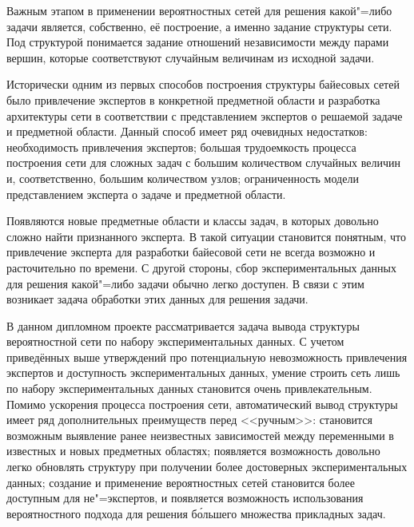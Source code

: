 Важным этапом в применении вероятностных сетей для решения какой"=либо задачи является, собственно, её построение, а именно задание структуры сети.
Под структурой понимается задание отношений независимости между парами вершин, которые соответствуют случайным величинам из исходной задачи.

Исторически одним из первых способов построения структуры байесовых сетей было привлечение экспертов в конкретной предметной области и разработка архитектуры сети в соответствии с представлением экспертов о решаемой задаче и предметной области.
Данный способ имеет ряд очевидных недостатков: необходимость привлечения экспертов; большая трудоемкость процесса построения сети для сложных задач с большим количеством случайных величин и, соответственно, большим количеством узлов; ограниченность модели представлением эксперта о задаче и предметной области.

Появляются новые предметные области и классы задач, в которых довольно сложно найти признанного эксперта.
В такой ситуации становится понятным, что привлечение эксперта для разработки байесовой сети не всегда возможно и расточительно по времени.
С другой стороны, сбор экспериментальных данных для решения какой"=либо задачи обычно легко доступен.
В связи с этим возникает задача обработки этих данных для решения задачи.

В данном дипломном проекте рассматривается задача вывода структуры вероятностной сети по набору экспериментальных данных.
С учетом приведённых выше утверждений про потенциальную невозможность привлечения экспертов и доступность экспериментальных данных, умение строить сеть лишь по набору экспериментальных данных становится очень привлекательным.
Помимо ускорения процесса построения сети, автоматический вывод структуры имеет ряд дополнительных преимуществ перед <<ручным>>: становится возможным выявление ранее неизвестных зависимостей между переменными в известных и новых предметных областях; появляется возможность довольно легко обновлять структуру при получении более достоверных экспериментальных данных; создание и применение вероятностных сетей становится более доступным для не"=экспертов, и появляется возможность использования вероятностного подхода для решения б\'{о}льшего множества прикладных задач.

